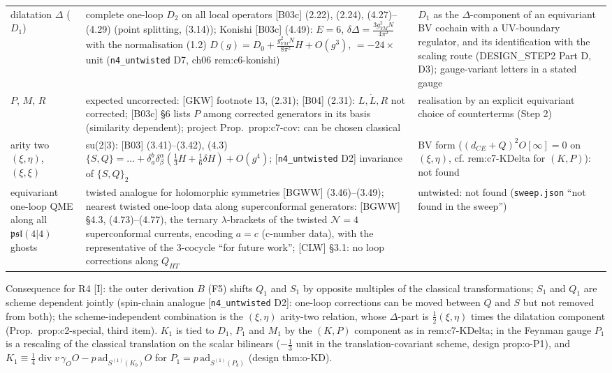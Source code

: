 \documentclass[11pt]{article}
\theoremstyle{definition}
\newcommand{\Il}{\textup{[I]}}
\begin{document}
\begin{longtable}{p{2.6cm}p{6.6cm}p{6.6cm}}
dilatation $\Delta$ ($D_1$) & complete one-loop $D_2$ on all local operators [B03c] (2.22), (2.24), (4.27)--(4.29) (point splitting, (3.14)); Konishi [B03c] (4.49): $E=6$, $\delta\Delta=\frac{3g_{YM}^2N}{4\pi^2}$ with the normalisation (1.2) $D(g)=D_0+\frac{g_{YM}^2N}{8\pi^2}H+O(g^3)$, $=-24\times$unit (\texttt{n4\_untwisted} D7, ch06 rem:c6-konishi) & $D_1$ as the $\Delta$-component of an equivariant BV cochain with a UV-boundary regulator, and its identification with the scaling route (DESIGN\_STEP2 Part D, D3); gauge-variant letters in a stated gauge\\
$P$, $M$, $R$ & expected uncorrected: [GKW] footnote 13, (2.31); [B04] (2.31): $L,\dot L,R$ not corrected; [B03c] \S6 lists $P$ among corrected generators in its basis (similarity dependent); project Prop.~prop:c7-cov: can be chosen classical & realisation by an explicit equivariant choice of counterterms (Step 2)\\
arity two $(\xi,\eta)$, $(\xi,\xi)$ & su(2$|$3): [B03] (3.41)--(3.42), (4.3) $\{S,Q\}=\dots+\delta^b_a\delta^\alpha_\beta(\frac13H+\frac16\delta H)+O(g^4)$; [\texttt{n4\_untwisted} D2] invariance of $\{S,Q\}_2$ & BV form ($(d_{CE}+Q)^2O[\infty]=0$ on $(\xi,\eta)$, cf. rem:c7-KDelta for $(K,P)$): not found\\
equivariant one-loop QME along all $\mathfrak{psl}(4|4)$ ghosts & twisted analogue for holomorphic symmetries [BGWW] (3.46)--(3.49); nearest twisted one-loop data along superconformal generators: [BGWW] \S4.3, (4.73)--(4.77), the ternary $\lambda$-brackets of the twisted $\mathcal N=4$ superconformal currents, encoding $a=c$ (c-number data), with the representative of the 3-cocycle ``for future work''; [CLW] \S3.1: no loop corrections along $Q_{HT}$ & untwisted: not found (\texttt{sweep.json} ``not found in the sweep'')\\
\bottomrule
\end{longtable}

Consequence for R4 \Il: the outer derivation $B$ (F5) shifts $Q_1$ and $S_1$ by opposite multiples of the classical transformations; $S_1$ and $Q_1$ are scheme dependent jointly (spin-chain analogue [\texttt{n4\_untwisted} D2]: one-loop corrections can be moved between $Q$ and $S$ but not removed from both); the scheme-independent combination is the $(\xi,\eta)$ arity-two relation, whose $\Delta$-part is $\tfrac12(\xi,\eta)$ times the dilatation component (Prop.~prop:c2-special, third item). $K_1$ is tied to $D_1$, $P_1$ and $M_1$ by the $(K,P)$ component as in rem:c7-KDelta; in the Feynman gauge $P_1$ is a rescaling of the classical translation on the scalar bilinears ($-\tfrac13$ unit in the translation-covariant scheme, design prop:o-P1), and $K_1\equiv\tfrac14\operatorname{div}v\,\gamma_O O-p\,\mathrm{ad}_{S^{(1)}(K_b)}O$ for $P_1=p\,\mathrm{ad}_{S^{(1)}(P_b)}$ (design thm:o-KD).
\end{document}
